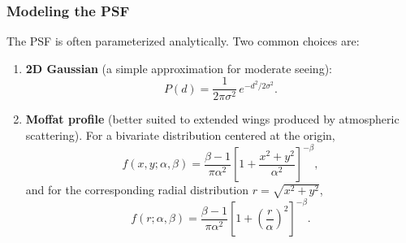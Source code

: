 \subsubsection{Modeling the PSF}

The PSF is often parameterized analytically. Two common choices are:

\begin{enumerate}
    \item \textbf{2D Gaussian} (a simple approximation for moderate seeing):
    $$
    P(d) = \frac{1}{2\pi\sigma^2}\,e^{-d^2/2\sigma^2}.
    $$

    \item \textbf{Moffat profile} (better suited to extended wings produced by atmospheric scattering). For a bivariate distribution centered at the origin,
    $$
    f(x,y;\alpha,\beta) = \frac{\beta - 1}{\pi\alpha^2}\left[1 + \frac{x^2+y^2}{\alpha^2}\right]^{-\beta},
    $$
    and for the corresponding radial distribution $r = \sqrt{x^2+y^2}$,
    $$
    f(r;\alpha,\beta) = \frac{\beta - 1}{\pi\alpha^2}\left[1 + \left(\frac{r}{\alpha}\right)^2\right]^{-\beta}.
    $$
\end{enumerate}

